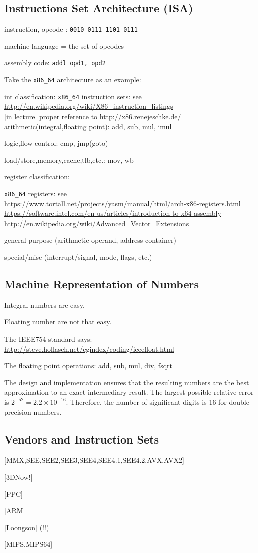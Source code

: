 \documentclass[main]{subfiles}
\begin{document}
\subsection{Instructions Set Architecture (ISA)}
instruction, opcode : \texttt{0010 0111 1101 0111}

machine language = the set of opcodes

assembly code: \texttt{addl opd1, opd2}

Take the \texttt{x86\_64} architecture as an example:

int classification:
\texttt{x86\_64} instruction sets: see \\
\url{http://en.wikipedia.org/wiki/X86_instruction_listings} \\

[in lecture] proper reference to \url{http://x86.renejeschke.de/} \\


arithmetic(integral,floating point): add, sub, mul, imul

logic,flow control: cmp, jmp(goto)

load/store,memory,cache,tlb,etc.: mov, wb


register classification:

\texttt{x86\_64} registers: see \\
\url{https://www.tortall.net/projects/yasm/manual/html/arch-x86-registers.html}\\
\url{https://software.intel.com/en-us/articles/introduction-to-x64-assembly}\\
\url{http://en.wikipedia.org/wiki/Advanced_Vector_Extensions}

general purpose (arithmetic operand, address container)

special/misc (interrupt/signal, mode, flags, etc.) 

\subsection{Machine Representation of Numbers}
Integral numbers are easy.

Floating number are not that easy.

The IEEE754 standard says: \\
\url{http://steve.hollasch.net/cgindex/coding/ieeefloat.html}

The floating point operations: add, sub, mul, div, fsqrt

The design and implementation ensures that the resulting numbers are the best
approximation to an exact intermediary result. The largest possible relative 
error is $2^{-52}=2.2\times10^{-16}$. Therefore, the number of significant
digits is 16 for double precision numbers.


\subsection{Vendors and Instruction Sets}
[MMX,SEE,SEE2,SEE3,SEE4,SEE4.1,SEE4.2,AVX,AVX2]

[3DNow!]

[PPC]

[ARM]

[Loongson] (!!)

[MIPS,MIPS64]

\end{document}
